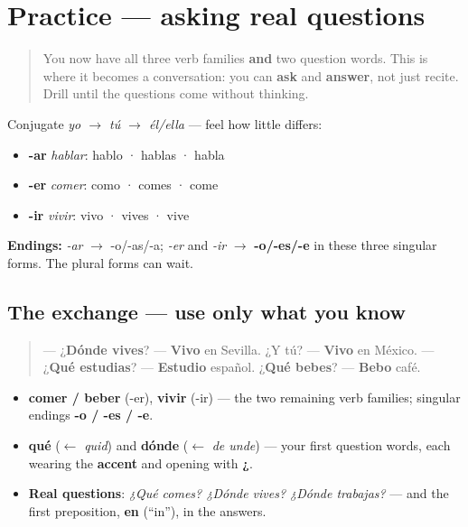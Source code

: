 \section[Practice]{Practice — asking real questions}

\label{lesson:ES-C07-practice}



\begin{quote}
You now have all three verb families \textbf{and} two question words. This is where it becomes a conversation: you can \textbf{ask} and \textbf{answer}, not just recite. Drill until the questions come without thinking.
\end{quote}

\begin{grammarlens}[title={Grammar Lens: three singular patterns}]
Conjugate \emph{yo $\to$ tú $\to$ él/ella} — feel how little differs:

\begin{itemize}
\raggedright
  \item \textbf{-ar} \emph{hablar}: hablo · hablas · habla
  \item \textbf{-er} \emph{comer}: como · comes · come
  \item \textbf{-ir} \emph{vivir}: vivo · vives · vive
\end{itemize}

\textbf{Endings:} \emph{-ar} $\to$ -o/-as/-a; \emph{-er} and \emph{-ir} $\to$ \textbf{-o/-es/-e} in these three singular forms. The plural forms can wait.
\end{grammarlens}

\subsection*{The exchange — use only what you know}
\begin{quote}
— ¿\textbf{Dónde vives}? — \textbf{Vivo} en Sevilla. ¿Y tú? — \textbf{Vivo} en México. — ¿\textbf{Qué estudias}? — \textbf{Estudio} español. ¿\textbf{Qué bebes}? — \textbf{Bebo} café.
\end{quote}

\begin{grammarlens}[title={What you've built this chapter}]
\begin{itemize}
\raggedright
  \item \textbf{comer / beber} (-er), \textbf{vivir} (-ir) — the two remaining verb families; singular endings \textbf{-o / -es / -e}.
  \item \textbf{qué} ($\leftarrow$ \emph{quid}) and \textbf{dónde} ($\leftarrow$ \emph{de unde}) — your first question words, each wearing the \textbf{accent} and opening with \textbf{¿}.
  \item \textbf{Real questions}: \emph{¿Qué comes? ¿Dónde vives? ¿Dónde trabajas?} — and the first preposition, \textbf{en} (\textquotedblleft{}in\textquotedblright{}), in the answers.
\end{itemize}
\end{grammarlens}

